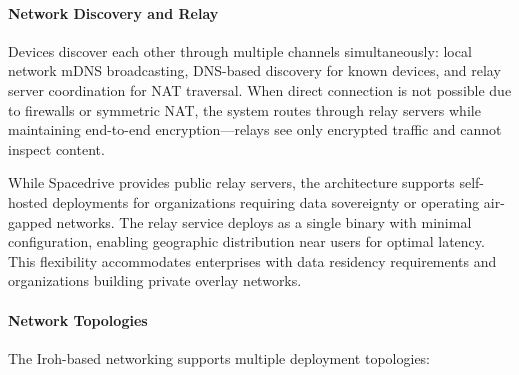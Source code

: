 \documentclass[sigconf]{acmart}
\begin{document}
\paragraph{Network Discovery and Relay}

Devices discover each other through multiple channels simultaneously: local network mDNS broadcasting, DNS-based discovery for known devices, and relay server coordination for NAT traversal. When direct connection is not possible due to firewalls or symmetric NAT, the system routes through relay servers while maintaining end-to-end encryption---relays see only encrypted traffic and cannot inspect content.

While Spacedrive provides public relay servers, the architecture supports self-hosted deployments for organizations requiring data sovereignty or operating air-gapped networks. The relay service deploys as a single binary with minimal configuration, enabling geographic distribution near users for optimal latency. This flexibility accommodates enterprises with data residency requirements and organizations building private overlay networks.

\paragraph{Network Topologies}
The Iroh-based networking supports multiple deployment topologies:
\end{document}
